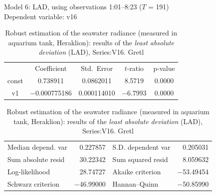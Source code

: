 \documentclass[10pt, a4paper]{article}
\begin{document}
\begin{appendices}
\begin{table}
\caption{Robust estimation of the seawater radiance (measured in aquarium tank, Heraklion): results of the \textit{least absolute deviation} (LAD), Series:V16. Gretl}
\begin{center}
Model 6: LAD, using observations 1:01--8:23 ($T$ = 191)\\
Dependent variable: v16\\

\vspace{1em}

\begin{tabular}{|c c c c c|}
  & {Coefficient} & {Std.\ Error} & {$t$-ratio} & {p-value} \\[1ex]
const &   0.738911 &     0.0862011 &       8.5719 &         0.0000 \\
v1 &   $-$0.000775186 &     0.000114010 &       $-$6.7993 &         0.0000 \\
\end{tabular}

\vspace{1ex}
\begin{tabular}{lrlr}
Median depend. var &  0.227857 & S.D. dependent var &  0.205031 \\
Sum absolute resid &  30.22342 & Sum squared resid &  8.059632 \\
Log-likelihood &  28.74727 & Akaike criterion & $-$53.49454 \\
Schwarz criterion & $-$46.99000 & Hannan--Quinn & $-$50.85990 \\
\end{tabular}
\end{center}
\end{table}
\pagebreak
\newpage


\end{appendices}
\end{document}
